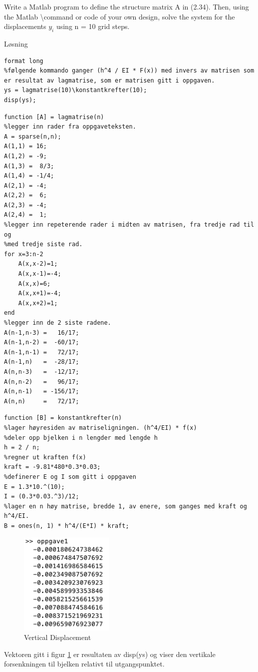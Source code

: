 % 

Write a Matlab program to define the structure matrix A in (2.34). Then, using the Matlab \textbackslash command or code of your own design, solve the system for the displacements $y_i$ using n = 10 grid steps.

\vspace{5mm}
Løsning

\begin{lstlisting}[caption={oppgave1.m}]
format long
%følgende kommando ganger (h^4 / EI * F(x)) med invers av matrisen som er resultat av lagmatrise, som er matrisen gitt i oppgaven.
ys = lagmatrise(10)\konstantkrefter(10);
disp(ys); 
\end{lstlisting}

\begin{lstlisting}[caption={lagmatrise.m}]
function [A] = lagmatrise(n)
%legger inn rader fra oppgaveteksten. 
A = sparse(n,n);
A(1,1) = 16;
A(1,2) = -9;
A(1,3) =  8/3;
A(1,4) = -1/4;
A(2,1) = -4;
A(2,2) =  6;
A(2,3) = -4;
A(2,4) =  1;
%legger inn repeterende rader i midten av matrisen, fra tredje rad til og
%med tredje siste rad. 
for x=3:n-2
    A(x,x-2)=1;
    A(x,x-1)=-4;
    A(x,x)=6;
    A(x,x+1)=-4;
    A(x,x+2)=1;
end
%legger inn de 2 siste radene. 
A(n-1,n-3) =   16/17;
A(n-1,n-2) =  -60/17;
A(n-1,n-1) =   72/17;
A(n-1,n)   =  -28/17;
A(n,n-3)   =  -12/17;
A(n,n-2)   =   96/17;
A(n,n-1)   = -156/17;
A(n,n)     =   72/17;
\end{lstlisting}

\begin{lstlisting}[caption={konstantkrefter.m}]
function [B] = konstantkrefter(n)
%lager høyresiden av matriseligningen. (h^4/EI) * f(x) 
%deler opp bjelken i n lengder med lengde h 
h = 2 / n;        
%regner ut kraften f(x) 
kraft = -9.81*480*0.3*0.03; 
%definerer E og I som gitt i oppgaven
E = 1.3*10.^(10); 
I = (0.3*0.03.^3)/12; 
%lager en n høy matrise, bredde 1, av enere, som ganges med kraft og h^4/EI.
B = ones(n, 1) * h^4/(E*I) * kraft;
\end{lstlisting}

\vspace{3mm}

\begin{figure}[h]
    \centering
    \includegraphics[width=0.4\textwidth]{sections/Exercise1/oppgave1disp}
    \caption{Vertical Displacement}
    \label{fig:verticaldisp}
\end{figure}
 
Vektoren gitt i figur \ref{fig:verticaldisp} er resultaten av disp(ys) og viser den vertikale forsenkningen til bjelken relativt til utgangspunktet.


% 